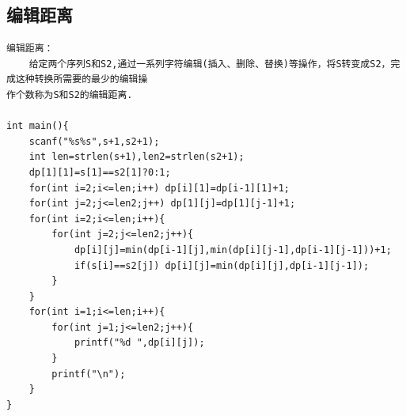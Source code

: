 \documentclass[twoside]{article}
\begin{document}
\subsection{编辑距离}
\begin{lstlisting}
编辑距离：
    给定两个序列S和S2,通过一系列字符编辑(插入、删除、替换)等操作，将S转变成S2，完成这种转换所需要的最少的编辑操
作个数称为S和S2的编辑距离.

int main(){
    scanf("%s%s",s+1,s2+1);
    int len=strlen(s+1),len2=strlen(s2+1);
    dp[1][1]=s[1]==s2[1]?0:1;
    for(int i=2;i<=len;i++) dp[i][1]=dp[i-1][1]+1;
    for(int j=2;j<=len2;j++) dp[1][j]=dp[1][j-1]+1;
    for(int i=2;i<=len;i++){
        for(int j=2;j<=len2;j++){
            dp[i][j]=min(dp[i-1][j],min(dp[i][j-1],dp[i-1][j-1]))+1;
            if(s[i]==s2[j]) dp[i][j]=min(dp[i][j],dp[i-1][j-1]);
        }
    }
    for(int i=1;i<=len;i++){
        for(int j=1;j<=len2;j++){
            printf("%d ",dp[i][j]);
        }
        printf("\n");
    }
}\end{lstlisting}
\end{document}
